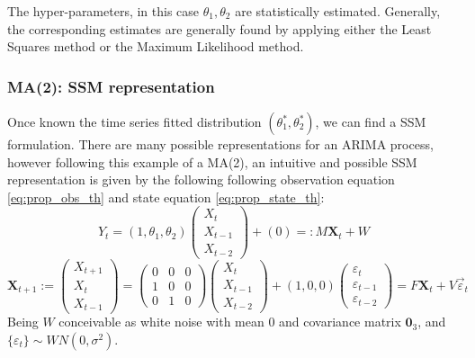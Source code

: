 \documentclass{article}
\theoremstyle{definition}
\theoremstyle{definition}
\theoremstyle{remark}
\theoremstyle{mythmstyle}
\begin{document}
The hyper-parameters, in this case $\theta_1, \theta_2$ are statistically estimated. Generally, the corresponding estimates are generally found by applying either the Least Squares method or the Maximum Likelihood method.

\subsubsection{MA(2): SSM representation}\label{ma2_ssm}

Once known the time series fitted distribution $(\theta_1^*, \theta_2^*)$, we can find a SSM formulation. There are many possible representations for an ARIMA process, however following this example of a MA(2), an intuitive and possible SSM representation is given by the following following observation equation \ref{eq:prop_obs_th} and state equation \ref{eq:prop_state_th}:
\begin{equation}\label{eq:prop_obs_th}
     Y_t = ( 1, \theta_1, \theta_2 ) \begin{pmatrix}
    X_{t} \\ X_{t-1} \\ X_{t-2}
    \end{pmatrix} + (0) =: M \mathbf{X}_t + W
 \end{equation} \begin{equation}\label{eq:prop_state_th}
     \bm{X}_{t+1} := \begin{pmatrix}
     X_{t+1} \\ X_{t} \\ X_{t-1}
     \end{pmatrix} = \begin{pmatrix}
      0 & 0 & 0 \\ 1 & 0  & 0 \\ 0 & 1 & 0 
     \end{pmatrix}
     \begin{pmatrix}
     X_{t} \\ X_{t-1} \\ X_{t-2}
     \end{pmatrix} + (1,0,0) \begin{pmatrix}
     \varepsilon_{t} \\ \varepsilon_{t-1} \\ \varepsilon_{t-2}
     \end{pmatrix}  = F \mathbf{X}_t + V \Vec{\varepsilon}_t
 \end{equation}
Being $W$ conceivable as white noise with mean 0 and covariance matrix $\mathbf{0}_{3}$, and $\{\varepsilon_t\} \sim WN(0, \sigma^2)$. 
\end{document}
